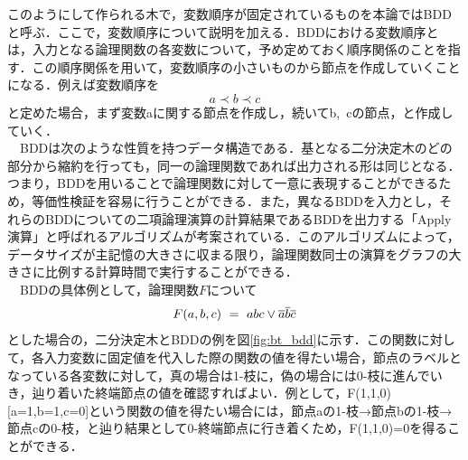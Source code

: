 \documentclass[12pt,twoside, fleqn]{ujbook}
\begin{document}
	\newpage
	このようにして作られる木で，変数順序が固定されているものを本論ではBDDと呼ぶ．ここで，変数順序について説明を加える．BDDにおける変数順序とは，入力となる論理関数の各変数について，予め定めておく順序関係のことを指す．この順序関係を用いて，変数順序の小さいものから節点を作成していくことになる．例えば変数順序を
	$$
	a\prec b\prec c
	$$
	と定めた場合，まず変数aに関する節点を作成し，続いてb,\ cの節点，と作成していく．\\
	　BDDは次のような性質を持つデータ構造である．基となる二分決定木のどの部分から縮約を行っても，同一の論理関数であれば出力される形は同じとなる．つまり，BDDを用いることで論理関数に対して一意に表現することができるため，等価性検証を容易に行うことができる．また，異なるBDDを入力とし，それらのBDDについての二項論理演算の計算結果であるBDDを出力する「Apply演算\cite{bryant86}」と呼ばれるアルゴリズムが考案されている．このアルゴリズムによって，データサイズが主記憶の大きさに収まる限り，論理関数同士の演算をグラフの大きさに比例する計算時間で実行することができる．\cite{Knuth:2009:ACP:1593023}\\
	\ \ BDDの具体例として，論理関数$F$について
	$$
	F(a,b,c)\ =\ abc\lor\overline{a}\overline{b}\overline{c}\\
	$$
	とした場合の，二分決定木とBDDの例を図\ref{fig:bt_bdd}に示す．この関数に対して，各入力変数に固定値を代入した際の関数の値を得たい場合，節点のラベルとなっている各変数に対して，真の場合は1-枝に，偽の場合には0-枝に進んでいき，辿り着いた終端節点の値を確認すればよい．例として，F(1,1,0)[a=1,b=1,c=0]という関数の値を得たい場合には，節点aの1-枝→節点bの1-枝→節点cの0-枝，と辿り結果として0-終端節点に行き着くため，F(1,1,0)=0を得ることができる．\\
	\ 
\end{document}
